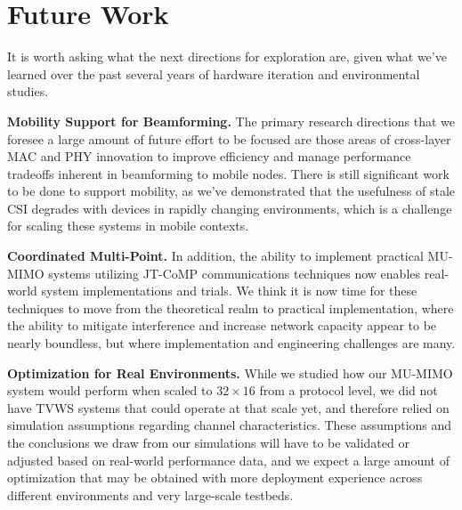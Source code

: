


\pagebreak

\section{Future Work}
\label{sec_future_work}

	It is worth asking what the next directions for exploration are, given what we've learned over the past several years of hardware iteration and environmental studies.
	
\textbf{Mobility Support for Beamforming.}
	The primary research directions that we foresee a large amount of future effort to be focused are those areas of cross-layer \ac{MAC} and \ac{PHY} innovation to improve efficiency and manage performance tradeoffs inherent in beamforming to mobile nodes.
		There is still significant work to be done to support mobility, as we've demonstrated that the usefulness of stale CSI degrades with devices in rapidly changing environments, which is a challenge for scaling these systems in mobile contexts.

\textbf{Coordinated Multi-Point.}
		In addition, the ability to implement practical \ac{MU-MIMO} systems utilizing \ac{JT}-\ac{CoMP} communications techniques now enables real-world system implementations and trials.
		We think it is now time for these techniques to move from the theoretical realm to practical implementation, where the ability to mitigate interference and increase network capacity appear to be nearly boundless, but where implementation and engineering challenges are many.

\textbf{Optimization for Real Environments.}
	While we studied how our \ac{MU-MIMO} system would perform when scaled to $32\times 16$ from a protocol level, we did not have \ac{TVWS} systems that could operate at that scale yet, and therefore relied on simulation assumptions regarding channel characteristics.
	These assumptions and the conclusions we draw from our simulations will have to be validated or adjusted based on real-world performance data, and we expect a large amount of optimization that may be obtained with more deployment experience across different environments and very large-scale testbeds.
	
